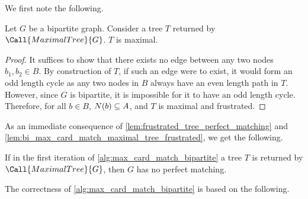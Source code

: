We first note the following. 
\begin{lemma}
    Let $G$ be a bipartite graph. Consider a tree $T$ returned by $\Call{MaximalTree}{G}$. $T$ is maximal. 
    \label{lem:bi_max_card_match_maximal_tree_frustrated}
\end{lemma}
\begin{proof}
    It suffices to show that there exists no edge between any two nodes $b_1, b_2 \in B$. By construction of $T$, if such 
    an edge were to exist, it would form an odd length cycle as any two nodes in $B$ always have an even length path in $T$. 
    However, since $G$ is bipartite, it is impossible for it to have an odd length cycle. Therefore, for all $b \in B$, $\f[N]{b} \sse A$, 
    and $T$ is maximal and frustrated. 
\end{proof}

As an immediate consequence of \cref{lem:frustrated_tree_perfect_matching} and \cref{lem:bi_max_card_match_maximal_tree_frustrated}, 
we get the following. 

\begin{corollary}
    If in the first iteration of \cref{alg:max_card_match_bipartite} a tree $T$ is returned by $\Call{MaximalTree}{G}$, 
    then $G$ has no perfect matching. 
    \label{cor:maximal_tree_bi_no_perf}
\end{corollary}

The correctness of \cref{alg:max_card_match_bipartite} is based on the following. 

